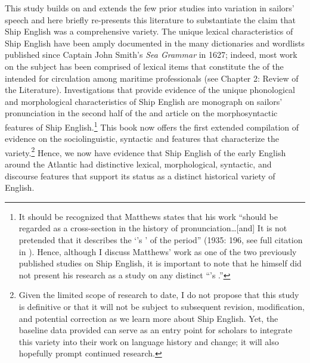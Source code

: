 This study builds on and extends the few prior studies into variation in sailors’ speech and here briefly re-presents this literature to substantiate the claim that Ship English was a comprehensive variety. The unique lexical characteristics of Ship English have been amply documented in the many dictionaries and wordlists published since Captain John Smith’s \textit{Sea Grammar} in 1627; indeed, most work on the subject has been comprised of lexical items that constitute the  of the  intended for circulation among maritime professionals (see Chapter 2: Review of the Literature). Investigations that provide evidence of the unique phonological and morphological characteristics of Ship English are  monograph on sailors’ pronunciation in the second half of the  and  article on the morphosyntactic features of Ship English.\footnote{It should be recognized that Matthews states that his work “should be regarded as a cross-section in the history of pronunciation…[and] It is not pretended that it describes the ‘’s ’ of the period” (1935: 196, see full citation in ). Hence, although I discuss Matthews’ work as one of the two previously published studies on Ship English, it is important to note that he himself did not present his research as a study on any distinct “’s .”}  This book now offers the first extended compilation of evidence on the sociolinguistic, syntactic and  features that characterize the variety.\footnote{Given the limited scope of research to date, I do not propose that this study is definitive or that it will not be subject to subsequent revision, modification, and potential correction as we learn more about Ship English. Yet, the baseline data provided can serve as an entry point for scholars to integrate this variety into their work on language history and change; it will also hopefully prompt continued research.}  Hence, we now have evidence that Ship English of the early English  around the Atlantic had distinctive lexical, morphological, syntactic, and discourse features that support its status as a distinct historical variety of English. 

